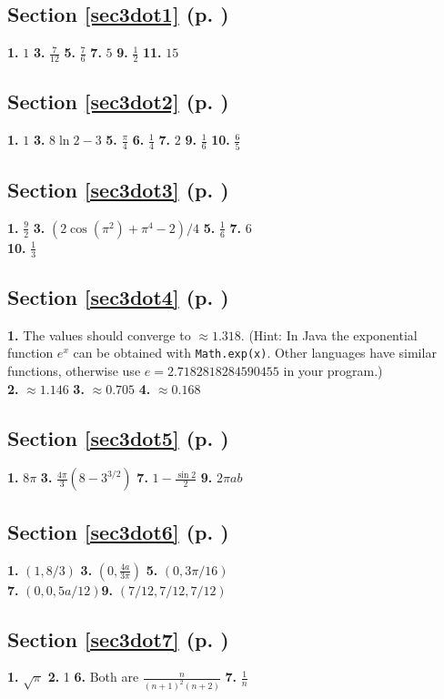 \begin{multicols}{2}
\subsection*{Section \ref{sec3dot1} (p. \pageref{sec3dot1})}
\textbf{1.} $1$\quad
\textbf{3.} $\frac{7}{12}$\quad
\textbf{5.} $\frac{7}{6}$\quad
\textbf{7.} $5$\quad
\textbf{9.} $\frac{1}{2}$\quad
\textbf{11.} $15$
\subsection*{Section \ref{sec3dot2} (p. \pageref{sec3dot2})}
\textbf{1.} $1$\quad
\textbf{3.} $8\ln 2 - 3$\quad
\textbf{5.} $\frac{\pi}{4}$\quad
\textbf{6.} $\frac{1}{4}$\quad
\textbf{7.} $2$\quad
\textbf{9.} $\frac{1}{6}$\quad
\textbf{10.} $\frac{6}{5}$
\subsection*{Section \ref{sec3dot3} (p. \pageref{sec3dot3})}
\textbf{1.} $\frac{9}{2}$\quad
\textbf{3.} $(2\cos(\pi^2) + \pi^4 -2)/4$\quad
\textbf{5.} $\frac{1}{6}$\quad
\textbf{7.} $6$\\
\textbf{10.} $\frac{1}{3}$
\subsection*{Section \ref{sec3dot4} (p. \pageref{sec3dot4})}
\textbf{1.} The values should converge to $\approx 1.318$. (Hint: In Java the exponential function $e^x$ can be obtained
with \texttt{Math.exp(x)}. Other languages have
similar functions, otherwise use $e=2.7182818284590455$ in your program.)\\\textbf{2.} $\approx 1.146$\quad
\textbf{3.} $\approx 0.705$\quad
\textbf{4.} $\approx 0.168$
\subsection*{Section \ref{sec3dot5} (p. \pageref{sec3dot5})}
\textbf{1.} $8\pi$\quad
\textbf{3.} $\frac{4\pi}{3}(8-3^{3/2})$\quad
\textbf{7.} $1-\frac{\sin 2}{2}$\quad
\textbf{9.} $2\pi ab$
\subsection*{Section \ref{sec3dot6} (p. \pageref{sec3dot6})}
\textbf{1.} $(1,8/3)$\quad
\textbf{3.} $(0,\frac{4a}{3\pi})$\quad
\textbf{5.} $(0,3\pi/16)$\\\textbf{7.} $(0,0,5a/12)$\quad\textbf{9.} $(7/12,7/12,7/12)$
\subsection*{Section \ref{sec3dot7} (p. \pageref{sec3dot7})}
\textbf{1.} $\sqrt{\pi}$\quad
\textbf{2.} 1\quad
\textbf{6.} Both are $\frac{n}{(n+1)^2 (n+2)}$\quad
\textbf{7.} $\frac{1}{n}$\quad


\end{multicols}
